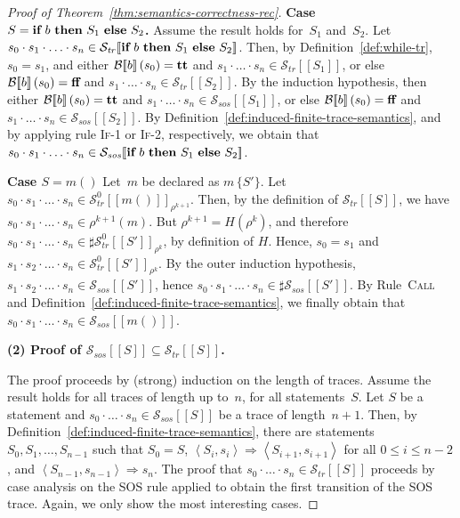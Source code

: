\documentclass[10pt,a4paper]{amsart}
\theoremstyle{definition}
\newcommand{\SOSTrans}[2]{#1 \Rightarrow #2}
\newcommand{\config}[2]{\left< #1, #2 \right>}
\newcommand{\SOSConfTrans}[4]{\SOSTrans{\config{#1}{#2}}{\config{#3}{#4}}}
\newcommand{\SOSConfFinTrans}[3]{\SOSTrans{\config{#1}{#2}}{#3}}
\newcommand{\denot}[1]{\left[\!\left[#1\right]\!\right]}
\newcommand{\bexdenot}[1]{\mathcal{B}\!\denot{#1}}
\newcommand{\trcdenot}[1]{\mathcal{S}_{\mathit{tr}}\!\denot{#1}}
\newcommand{\trcdenoth}[1]{\mathcal{S}^0_{\mathit{tr}}\!\denot{#1}}
\newcommand{\sosdenot}[1]{\mathcal{S}_{\mathit{sos}}\!\denot{#1}}
\newcommand{\If}{\mbox{\bf if}}
\newcommand{\Then}{\mbox{\bf then}}
\newcommand{\Else}{\mbox{\bf else}}
\newcommand{\ttt}{\mbox{\bf tt}}
\newcommand{\fff}{\mbox{\bf ff}}
\begin{document}
\begin{proof}[Proof of Theorem~\ref{thm:semantics-correctness-rec}]
\noindent\textbf{Case $S = \If\ b\ \Then\ S_1\ \Else\ S_2$.}
%
Assume the result holds for~$S_1$ and~$S_2$.
%
Let 
$s_0 \cdot s_1 \cdot \ldots \cdot s_n \in 
 \trcdenot{\If\ b\ \Then\ S_1\ \Else\ S_2}$.
Then, by Definition~\ref{def:while-tr}, 
$s_0 = s_1$, and either $\bexdenot{b} (s_0) = \ttt$ and 
$s_1 \cdot \ldots \cdot s_n \in \trcdenot{S_1}$,
or else $\bexdenot{b} (s_0) = \fff$ and 
$s_1 \cdot \ldots \cdot s_n \in \trcdenot{S_2}$.
By the induction hypothesis, then 
either $\bexdenot{b} (s_0) = \ttt$ and 
$s_1 \cdot \ldots \cdot s_n \in \sosdenot{S_1}$,
or else $\bexdenot{b} (s_0) = \fff$ and 
$s_1 \cdot \ldots \cdot s_n \in \sosdenot{S_2}$.
%
By Definition~\ref{def:induced-finite-trace-semantics},
and by applying rule \textsc{If-1} or \textsc{If-2},
respectively, we obtain that
$s_0 \cdot s_1 \cdot \ldots \cdot s_n \in 
 \sosdenot{\If\ b\ \Then\ S_1\ \Else\ S_2}$.

\noindent\textbf{Case $S = m ()$} Let~$m$ be declared as $m\, \{S'\}$.
%
Let 
$s_0 \cdot s_1 \cdot \ldots \cdot s_n \in \trcdenoth{m ()}_{\rho^{k+1}}$.
%
Then, by the definition of $\trcdenot{S}$, we have
$s_0 \cdot s_1 \cdot \ldots \cdot s_n \in \rho^{k+1} (m)$.  But
$\rho^{k+1} = H (\rho^k)$, and therefore
$s_0 \cdot s_1 \cdot \ldots \cdot s_n \in \sharp
\trcdenoth{S'}_{\rho^k}$, by definition of $H$.
%
Hence, $s_0 = s_1$ and
$s_1 \cdot s_2 \cdot \ldots \cdot s_n \in \trcdenoth{S'}_{\rho^k}$.
By the outer induction hypothesis,
$s_1 \cdot s_2 \cdot \ldots \cdot s_n \in \sosdenot{S'}$, hence
$s_0 \cdot s_1 \cdot \ldots \cdot s_n \in \sharp \sosdenot{S'}$. By
Rule~\textsc{Call} and
Definition~\ref{def:induced-finite-trace-semantics}, we finally obtain
that $s_0 \cdot s_1 \cdot \ldots \cdot s_n \in \sosdenot{m ()}$.

\noindent\textbf{(2) Proof of $\sosdenot{S} \subseteq \trcdenot{S}$.}

The proof proceeds by (strong) induction on the length of traces.
%
Assume the result holds for all traces of length up to~$n$, for all
statements~$S$. Let $S$ be a statement and
$s_0 \cdot \ldots \cdot s_n \in \sosdenot{S}$ be a trace of
length~$n+1$. Then, by
Definition~\ref{def:induced-finite-trace-semantics}, there are
statements $S_0, S_1, \ldots, S_{n-1}$ such that $S_0 = S$,
$\SOSConfTrans{S_i}{s_i}{S_{i+1}}{s_{i+1}}$ for all
$0 \leq i \leq n-2$, and $\SOSConfFinTrans{S_{n-1}}{s_{n-1}}{s_n}$.
The proof that $s_0 \cdot \ldots \cdot s_n \in \trcdenot{S}$ proceeds
by case analysis on the SOS rule applied to obtain the first
transition of the SOS trace.
%
Again, we only show the most interesting cases.


\end{proof}
\end{document}
